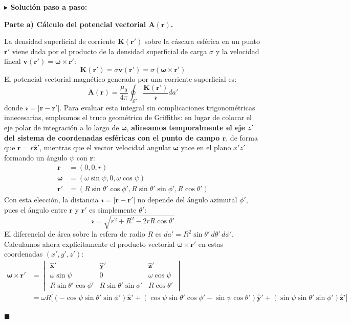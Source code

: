 \documentclass[11pt,a4paper]{book}
\newenvironment{solucion}{%
    \par\medskip\noindent\textbf{\color{blue!65!black}\Large $\blacktriangleright$ Solución paso a paso:}\par\medskip
}{%
    \hfill$\blacksquare$\par\bigskip
}
\newcommand{\xhat}{\hat{\bm{x}}}
\newcommand{\yhat}{\hat{\bm{y}}}
\newcommand{\zhat}{\hat{\bm{z}}}
\newcommand{\Avec}{\bm{A}}
\begin{document}
\begin{solucion}
\textbf{Parte a) Cálculo del potencial vectorial $\Avec(\bm{r})$.}

La densidad superficial de corriente $\bm{K}(\bm{r}')$ sobre la cáscara esférica en un punto $\bm{r}'$ viene dada por el producto de la densidad superficial de carga $\sigma$ y la velocidad lineal $\bm{v}(\bm{r}') = \bm{\omega} \times \bm{r}'$:
\begin{equation}
    \bm{K}(\bm{r}') = \sigma \bm{v}(\bm{r}') = \sigma (\bm{\omega} \times \bm{r}')
\end{equation}
El potencial vectorial magnético generado por una corriente superficial es:
\begin{equation}
    \Avec(\bm{r}) = \frac{\mu_0}{4\pi} \oint_{\mathcal{S}'} \frac{\bm{K}(\bm{r}')}{\mathscr{r}} da'
\end{equation}
donde $\mathscr{r} = |\bm{r} - \bm{r}'|$. Para evaluar esta integral sin complicaciones trigonométricas innecesarias, empleamos el truco geométrico de Griffiths: en lugar de colocar el eje polar de integración a lo largo de $\bm{\omega}$, \textbf{alineamos temporalmente el eje $z'$ del sistema de coordenadas esféricas con el punto de campo $\bm{r}$}, de forma que $\bm{r} = r\zhat'$, mientras que el vector velocidad angular $\bm{\omega}$ yace en el plano $x'z'$ formando un ángulo $\psi$ con $\bm{r}$:
\begin{align}
    \bm{r} &= (0, 0, r) \\
    \bm{\omega} &= (\omega\sin\psi, 0, \omega\cos\psi) \\
    \bm{r}' &= (R\sin\theta'\cos\phi', R\sin\theta'\sin\phi', R\cos\theta')
\end{align}
Con esta elección, la distancia $\mathscr{r} = |\bm{r} - \bm{r}'|$ no depende del ángulo azimutal $\phi'$, pues el ángulo entre $\bm{r}$ y $\bm{r}'$ es simplemente $\theta'$:
\begin{equation}
    \mathscr{r} = \sqrt{r^2 + R^2 - 2rR\cos\theta'}
\end{equation}
El diferencial de área sobre la esfera de radio $R$ es $da' = R^2\sin\theta'\,d\theta'\,d\phi'$. Calculamos ahora explícitamente el producto vectorial $\bm{\omega} \times \bm{r}'$ en estas coordenadas $(x', y', z')$:
\begin{align}
    \bm{\omega} \times \bm{r}' &= \begin{vmatrix}
        \xhat' & \yhat' & \zhat' \\
        \omega\sin\psi & 0 & \omega\cos\psi \\
        R\sin\theta'\cos\phi' & R\sin\theta'\sin\phi' & R\cos\theta'
    \end{vmatrix} \nonumber \\
    &= \omega R \Big[ (-\cos\psi\sin\theta'\sin\phi')\xhat' + (\cos\psi\sin\theta'\cos\phi' - \sin\psi\cos\theta')\yhat' + (\sin\psi\sin\theta'\sin\phi')\zhat' \Big]
\end{align}


\end{solucion}
\end{document}

